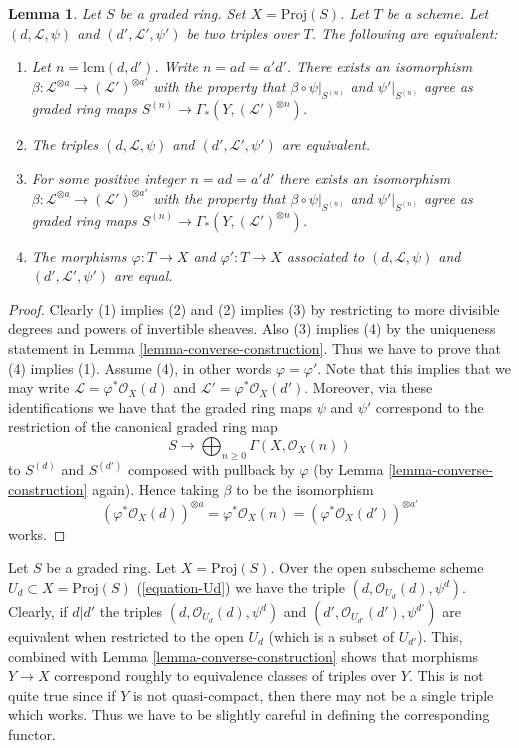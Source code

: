 \documentclass{stacks-project}
\theoremstyle{plain}
\newtheorem{lemma}[subsection]{Lemma}
\theoremstyle{definition}
\theoremstyle{remark}
\numberwithin{equation}{subsection}
\begin{document}
\begin{lemma}
\label{lemma-equivalent}
Let $S$ be a graded ring. Set $X = \text{Proj}(S)$. Let $T$ be a scheme.
Let $(d, \mathcal{L}, \psi)$ and $(d', \mathcal{L}', \psi')$
be two triples over $T$. The following are equivalent:
\begin{enumerate}
\item Let $n = \text{lcm}(d, d')$. Write $n = ad = a'd'$. There exists
an isomorphism
$\beta : \mathcal{L}^{\otimes a} \to (\mathcal{L}')^{\otimes a'}$
with the property that
$\beta \circ \psi|_{S^{(n)}}$ and $\psi'|_{S^{(n)}}$ agree
as graded ring maps $S^{(n)} \to \Gamma_*(Y, (\mathcal{L}')^{\otimes n})$.
\item The triples $(d, \mathcal{L}, \psi)$ and $(d', \mathcal{L}', \psi')$
are equivalent.
\item For some positive integer $n = ad = a'd'$ there exists
an isomorphism
$\beta : \mathcal{L}^{\otimes a} \to (\mathcal{L}')^{\otimes a'}$
with the property that
$\beta \circ \psi|_{S^{(n)}}$ and $\psi'|_{S^{(n)}}$ agree
as graded ring maps $S^{(n)} \to \Gamma_*(Y, (\mathcal{L}')^{\otimes n})$.
\item The morphisms $\varphi : T \to X$ and $\varphi' : T \to X$
associated to $(d, \mathcal{L}, \psi)$ and $(d', \mathcal{L}', \psi')$
are equal.
\end{enumerate}
\end{lemma}

\begin{proof}
Clearly (1) implies (2) and (2) implies (3) by restricting to
more divisible degrees and powers of invertible sheaves.
Also (3) implies (4) by the uniqueness statement
in Lemma \ref{lemma-converse-construction}.
Thus we have to prove that (4) implies (1). Assume (4),
in other words $\varphi = \varphi'$.
Note that this implies that we may write
$\mathcal{L} = \varphi^*\mathcal{O}_X(d)$ and
$\mathcal{L}' = \varphi^*\mathcal{O}_X(d')$.
Moreover, via these identifications we have that the graded ring
maps $\psi$ and $\psi'$ correspond to the restriction of the canonical
graded ring map
$$
S \longrightarrow \bigoplus\nolimits_{n \geq 0} \Gamma(X, \mathcal{O}_X(n))
$$
to $S^{(d)}$ and $S^{(d')}$ composed with pullback by $\varphi$
(by Lemma \ref{lemma-converse-construction} again). Hence taking
$\beta$ to be the isomorphism
$$
(\varphi^*\mathcal{O}_X(d))^{\otimes a} =
\varphi^*\mathcal{O}_X(n) =
(\varphi^*\mathcal{O}_X(d'))^{\otimes a'}
$$
works.
\end{proof}

\noindent
Let $S$ be a graded ring.
Let $X = \text{Proj}(S)$.
Over the open subscheme scheme $U_d \subset X = \text{Proj}(S)$
(\ref{equation-Ud}) we have the triple
$(d, \mathcal{O}_{U_d}(d), \psi^d)$. Clearly, if $d | d'$ the triples
$(d, \mathcal{O}_{U_d}(d), \psi^d)$ and
$(d', \mathcal{O}_{U_{d'}}(d'), \psi^{d'})$ are equivalent
when restricted to the open $U_d$ (which is a subset of $U_{d'}$).
This, combined with Lemma \ref{lemma-converse-construction} shows
that morphisms $Y \to X$ correspond roughly to
equivalence classes of triples over $Y$. This is not quite true since if $Y$ is
not quasi-compact, then there may not be a single triple which works.
Thus we have to be slightly careful in defining the corresponding functor.
\end{document}
